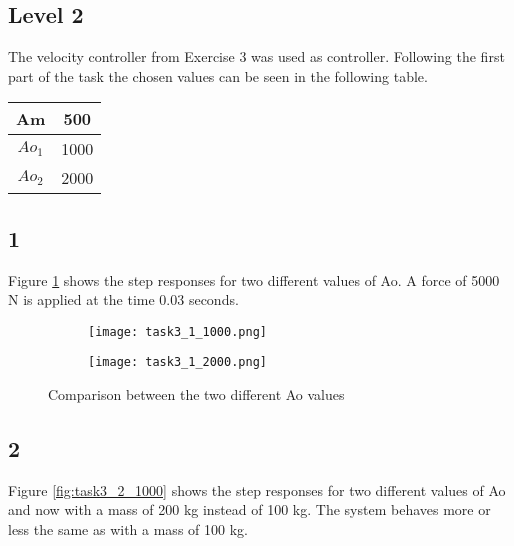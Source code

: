%
%
%
%
%

\subsection*{Level 2}
The velocity controller from Exercise 3 was used as controller. Following the first part of the task the chosen values can be seen in the following table.

\begin{center}

	\begin{tabular}{| c | c |}
		\hline
		Am & 500 \\ \hline
		$Ao_1$ & 1000 \\ \hline
		$Ao_2$ & 2000 \\
		\hline
		

	\end{tabular}

\end{center}

\subsection*{1}
Figure \ref{fig:task3_1_1000} shows the step responses for two different values of Ao. A force of 5000 N is applied at the time 0.03 seconds.

\begin{figure}[H]
    \centering
    \begin{subfigure}[b]{0.45\textwidth}
        \texttt{[image: task3\_1\_1000.png]}
    \end{subfigure}
    \begin{subfigure}[b]{0.45\textwidth}
        \texttt{[image: task3\_1\_2000.png]}
    \end{subfigure}
	\caption{Comparison between the two different Ao values}
	\label{fig:task3_1_1000}
\end{figure}

\subsection*{2}
Figure \ref{fig:task3_2_1000} shows the step responses for two different values of Ao and now with a mass of 200 kg instead of 100 kg. The system behaves more or less the same as with a mass of 100 kg.

